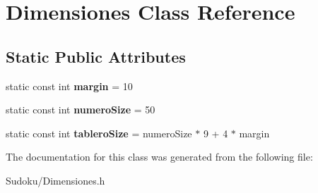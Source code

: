 \hypertarget{class_dimensiones}{\section{Dimensiones Class Reference}
\label{class_dimensiones}
}
\subsection*{Static Public Attributes}
\begin{DoxyCompactItemize}
\item 
\hypertarget{class_dimensiones_a2fb9391d1230b6cc7a2a4008e74bcddc}{static const int {\bfseries margin} = 10}\label{class_dimensiones_a2fb9391d1230b6cc7a2a4008e74bcddc}

\item 
\hypertarget{class_dimensiones_a961ddc06835eac206208ca5069d935b7}{static const int {\bfseries numero\-Size} = 50}\label{class_dimensiones_a961ddc06835eac206208ca5069d935b7}

\item 
\hypertarget{class_dimensiones_ade4db223d06ae4688d1f39835bdb4654}{static const int {\bfseries tablero\-Size} = numero\-Size $\ast$ 9 + 4 $\ast$ margin}\label{class_dimensiones_ade4db223d06ae4688d1f39835bdb4654}

\end{DoxyCompactItemize}


The documentation for this class was generated from the following file\-:\begin{DoxyCompactItemize}
\item 
Sudoku/Dimensiones.\-h\end{DoxyCompactItemize}
